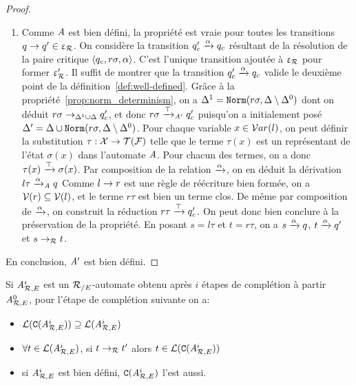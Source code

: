 \begin{proof}
\begin{enumerate}
\item \label{two}
  Comme $\mathit A$ est bien défini, la propriété est vraie pour toutes les transitions $q \rightarrow q'\in \upvarepsilon_{\mathcal R}$.
  On considère la transition $q'_c \xrightarrow{\alpha} q_c$ résultant de la résolution de la paire critique $\langle q_c ,r\sigma,\alpha\rangle$. 
  C'est l'unique transition ajoutée à $\upvarepsilon_{\mathcal R}$ pour former $\upvarepsilon_{\mathcal R}'$. Il suffit de montrer que la transition $q'_c \xrightarrow{\alpha} q_c$
  valide le deuxième point de la définition~\ref{def:well-defined}.
  Grâce à la propriété~\ref{prop:norm_determinism}, on a $\Delta^1 = \mathtt{Norm}(r\sigma,\Delta\setminus\Delta^0)$ dont on
  déduit $r\sigma \rightarrow_{\Delta^1\cup\Delta} q'_c$, et donc $r\sigma \xrightarrow{\top}_{\mathit A'} q'_c$ puisqu'on a initialement posé 
  $\Delta' = \Delta \cup \mathtt{Norm}(r\sigma,\Delta\setminus\Delta^0)$.
  Pour chaque variable $x\in\mathcal{ V}ar(l)$, on peut définir la substitution $\tau:\mathcal X \rightarrow \mathcal{T(F)}$ 
  telle que le terme $\tau(x)$ est un représentant de l'état $\sigma(x)$ dans l'automate $\mathit A$.
  Pour chacun des termes, on a donc $\tau(x) \xrightarrow{\top} \sigma(x)$.
  Par composition de la relation $\xrightarrow{\alpha}$, on en déduit la dérivation $l\tau\xrightarrow{\alpha}_\mathit A q$
  Comme $l\rightarrow r$ est une règle de réécriture bien formée, on a $\mathcal V(r) \subseteq \mathcal V(l)$,
  et le terme $r\tau$ est bien un terme clos. De même par composition de $\xrightarrow{\alpha}$, 
  on construit la réduction $r\tau \xrightarrow{\top} q'_c$. On peut donc bien conclure à la préservation de la propriété.
  En posant $s=l\tau$ et $t=r\tau$, on a $s\xrightarrow{\alpha}q $, $t\xrightarrow{\alpha}q' $ et $s\rightarrow_\mathcal R t $.
\end{enumerate}
En conclusion, $\mathit A'$ est bien défini.
\end{proof}

\begin{theorem}
  \label{thm:C}
  Si ${\mathit A}_{\mathcal R,E}^i$ est un ${\mathcal R_{/E}}$-automate obtenu après $i$ étapes de complétion à partir ${\mathit A}_{\mathcal R,E}^0$,
  pour l'étape de complétion suivante on a:
  \begin{itemize}
  \item $\mathcal{L}(\mathtt{C}({\mathit A}_{\mathcal R,E}^i)) \supseteq \mathcal{L}({\mathit A}_{\mathcal R,E}^i)$
  \item $\forall t \in \mathcal{L}({\mathit A}_{\mathcal R,E}^i)$, si $t \rightarrow_\mathcal R t'$ alors $t \in \mathcal{L}(\mathtt{C}({\mathit A}_{\mathcal R,E}^i))$
  \item si ${\mathit A}_{\mathcal R,E}^i$ est bien défini, $\mathtt{C}({\mathit A}_{\mathcal R,E}^i)$ l'est aussi.
  \end{itemize}
\end{theorem}

